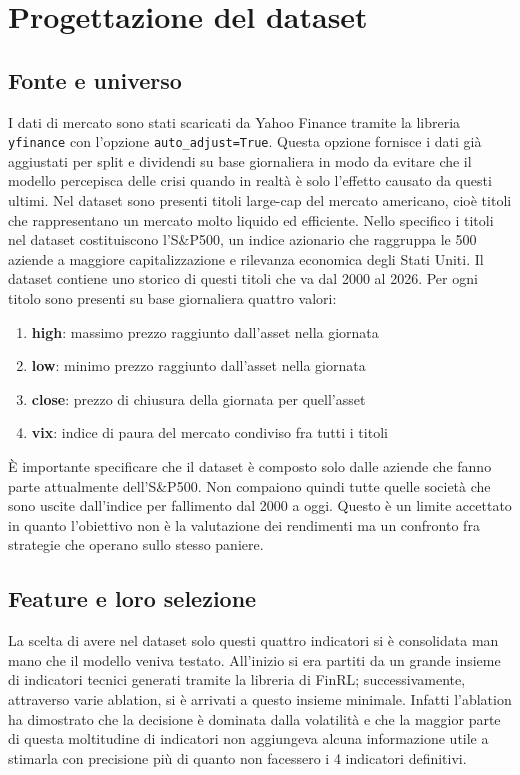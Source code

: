 
\section{Progettazione del dataset}
\label{sec:dataset}

\subsection{Fonte e universo}
I dati di mercato sono stati scaricati da Yahoo Finance tramite la libreria \texttt{yfinance} con l'opzione \texttt{auto\_adjust=True}. 
Questa opzione fornisce i dati già aggiustati per split e dividendi su base giornaliera in modo da evitare che il modello percepisca delle crisi quando in realtà è solo l'effetto causato da questi ultimi.
Nel dataset sono presenti titoli large-cap del mercato americano, cioè titoli che rappresentano un mercato molto liquido ed efficiente.
Nello specifico i titoli nel dataset costituiscono l'S\&P500, un indice azionario che raggruppa le 500 aziende a maggiore capitalizzazione e rilevanza economica degli Stati Uniti.
Il dataset contiene uno storico di questi titoli che va dal 2000 al 2026.
Per ogni titolo sono presenti su base giornaliera quattro valori:
\begin{enumerate}
    \item \textbf{high}: massimo prezzo raggiunto dall'asset nella giornata
    \item \textbf{low}: minimo prezzo raggiunto dall'asset nella giornata
    \item \textbf{close}: prezzo di chiusura della giornata per quell'asset
    \item \textbf{vix}: indice di paura del mercato condiviso fra tutti i titoli
\end{enumerate}

È importante specificare che il dataset è composto solo dalle aziende che fanno parte attualmente dell'S\&P500. Non compaiono quindi tutte quelle società che sono uscite dall'indice per fallimento dal 2000 a oggi.
Questo è un limite accettato in quanto l'obiettivo non è la valutazione dei rendimenti ma un confronto fra strategie che operano sullo stesso paniere.


\subsection{Feature e loro selezione}
La scelta di avere nel dataset solo questi quattro indicatori si è consolidata man mano che il modello veniva testato.
All'inizio si era partiti da un grande insieme di indicatori tecnici generati tramite la libreria di FinRL; successivamente, attraverso varie ablation, si è arrivati a questo insieme minimale.
Infatti l'ablation ha dimostrato che la decisione è dominata dalla volatilità e che la maggior parte di questa moltitudine di indicatori non aggiungeva alcuna informazione utile a stimarla con precisione più di quanto non facessero i 4 indicatori definitivi.


